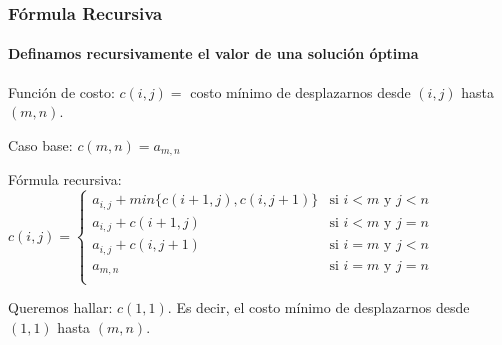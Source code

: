 \documentclass[spanish]{beamer}
\begin{document}
    \begin{frame}
        \frametitle{Fórmula Recursiva}
        \framesubtitle{Definamos recursivamente el valor de una solución óptima}

        \begin{block}{Función de costo:}
            $c(i, j) =$ costo mínimo de desplazarnos desde $(i, j)$ hasta $(m, n)$.
        \end{block}

        \begin{block}{Caso base:}
            $c(m, n) = a_{m,n}$
        \end{block}

        \begin{block}{Fórmula recursiva:}
            \vspace{0.5em}
            $
            c(i, j) =
            \left\{
                \begin{array}{ll}
                    a_{i,j} + min\{ c(i + 1, j), c(i, j + 1) \} & \mbox{si } i < m \mbox{ y } j < n \\
                    a_{i,j} + c(i + 1, j)                       & \mbox{si } i < m \mbox{ y } j = n \\
                    a_{i,j} + c(i, j + 1)                       & \mbox{si } i = m \mbox{ y } j < n \\
                    a_{m,n}                                     & \mbox{si } i = m \mbox{ y } j = n \\
                \end{array}
            \right.
            $
        \end{block}

        \begin{block}{Queremos hallar:}
            $c(1, 1)$. Es decir, el costo mínimo de desplazarnos desde $(1, 1)$ hasta $(m, n)$.
        \end{block}
    \end{frame}
\end{document}

